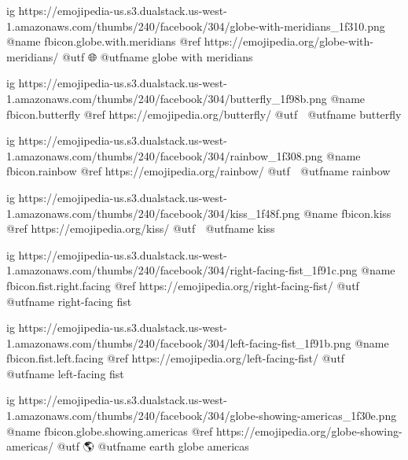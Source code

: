	ig https://emojipedia-us.s3.dualstack.us-west-1.amazonaws.com/thumbs/240/facebook/304/globe-with-meridians_1f310.png
	@name fbicon.globe.with.meridians
	@ref https://emojipedia.org/globe-with-meridians/
	@utf 🌐
	@utfname globe with meridians

	ig https://emojipedia-us.s3.dualstack.us-west-1.amazonaws.com/thumbs/240/facebook/304/butterfly_1f98b.png
	@name fbicon.butterfly
	@ref https://emojipedia.org/butterfly/
	@utf 🦋
	@utfname butterfly

	ig https://emojipedia-us.s3.dualstack.us-west-1.amazonaws.com/thumbs/240/facebook/304/rainbow_1f308.png
	@name fbicon.rainbow
	@ref https://emojipedia.org/rainbow/
	@utf 🌈
	@utfname rainbow

	ig https://emojipedia-us.s3.dualstack.us-west-1.amazonaws.com/thumbs/240/facebook/304/kiss_1f48f.png
	@name fbicon.kiss
	@ref https://emojipedia.org/kiss/
	@utf 💏
	@utfname kiss

	ig https://emojipedia-us.s3.dualstack.us-west-1.amazonaws.com/thumbs/240/facebook/304/right-facing-fist_1f91c.png
	@name fbicon.fist.right.facing
	@ref https://emojipedia.org/right-facing-fist/
	@utf 🤜
	@utfname right-facing fist

	ig https://emojipedia-us.s3.dualstack.us-west-1.amazonaws.com/thumbs/240/facebook/304/left-facing-fist_1f91b.png
	@name fbicon.fist.left.facing
	@ref https://emojipedia.org/left-facing-fist/
	@utf 🤛
	@utfname left-facing fist

	ig https://emojipedia-us.s3.dualstack.us-west-1.amazonaws.com/thumbs/240/facebook/304/globe-showing-americas_1f30e.png
	@name fbicon.globe.showing.americas
	@ref https://emojipedia.org/globe-showing-americas/
	@utf 🌎
	@utfname earth globe americas

\fi

